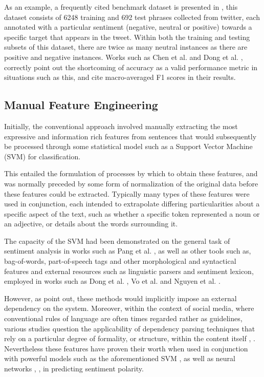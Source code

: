 \documentclass[../../fyp.tex]{subfiles}
\begin{document}
As an example, a frequently cited benchmark dataset is presented in \cite{dong}, this dataset consists of 6248 training and 692 test phrases collected from twitter, each annotated with a particular sentiment (negative, neutral or positive) towards a specific target that appears in the tweet. Within both the training and testing subsets of this dataset, there are twice as many neutral instances as there are positive and negative instances. Works such as Chen et al. \cite{chen2017} and Dong et al. \cite{dong}, correctly point out the shortcoming of accuracy as a valid performance metric in situations such as this, and cite macro-averaged F1 scores in their results.

\subsection{Manual Feature Engineering}
Initially, the conventional approach involved manually extracting the most expressive and information rich features from sentences that would subsequently be processed through some statistical model such as a Support Vector Machine (SVM) for classification.

This entailed the formulation of processes by which to obtain these features, and was normally preceded by some form of normalization of the original data before these features could be extracted. Typically many types of these features were used in conjunction, each intended to extrapolate differing particularities about a specific aspect of the text, such as whether a specific token represented a noun or an adjective, or details about the words surrounding it.

The capacity of the SVM had been demonstrated on the general task of sentiment analysis in works such as Pang et al. \cite{pang2002}, as well as other tools such as, bag-of-words, part-of-speech tags and other morphological and syntactical features and external resources such as linguistic parsers and sentiment lexicon, employed in works such as Dong et al. \cite{dong}, Vo et al. \cite{vo2015} and Nguyen et al. \cite{nguyen2015}.

However, as \cite{tang2016b} point out, these methods would implicitly impose an external dependency on the system. Moreover, within the context of social media, where conventional rules of language are often times regarded rather as guidelines, various studies question the applicability of dependency parsing techniques that rely on a particular degree of formality, or structure, within the content itself \cite{tang2016b}, \cite{chen2017}. Nevertheless these features have proven their worth when used in conjunction with powerful models such as the aforementioned SVM \cite{kiritchenko} \cite{wagner2014}, as well as neural networks \cite{dong}, \cite{vo2015}, in predicting sentiment polarity.
\end{document}
